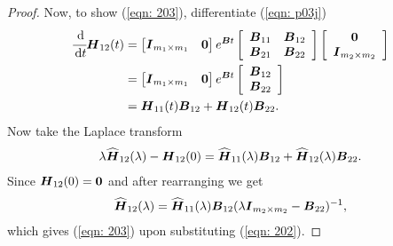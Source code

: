 \begin{proof}
	Now, to show (\ref{eqn: 203}), differentiate (\ref{eqn: p03j})
	\begin{align}
		\cfrac{\, \mathrm{d}}{\, \mathrm{d} t}\boldsymbol H_{12}(t) &= \begin{bmatrix}   \boldsymbol I_{m_1\times m_1} & \boldsymbol 0 \end{bmatrix}e^{\boldsymbol Bt} \left[\begin{array}{cc} \boldsymbol B_{11} & \boldsymbol B_{12} \\ \boldsymbol B_{21} & \boldsymbol B_{22} \end{array}\right] \left[\begin{array}{c} \boldsymbol 0 \\ \boldsymbol I_{m_2\times m_2}\end{array}\right] \nonumber
		\\&= \begin{bmatrix}   \boldsymbol I_{m_1\times m_1} & \boldsymbol 0 \end{bmatrix}e^{\boldsymbol Bt} \left[\begin{array}{c} \boldsymbol B_{12} \\ \boldsymbol B_{22} \end{array}\right] \nonumber
		\\&= \boldsymbol H_{11}(t) \boldsymbol B_{12} + \boldsymbol H_{12}(t)\boldsymbol B_{22}.
	\end{align}
	Now take the Laplace transform 
	\begin{align}
		\lambda \widehat{\boldsymbol H}_{12}(\lambda) - \boldsymbol H_{12}(0) = \widehat{\boldsymbol H}_{11}(\lambda) \boldsymbol B_{12} + \widehat{\boldsymbol H}_{12}(\lambda)\boldsymbol B_{22}.
	\end{align}
	Since \(\boldsymbol H_{12}(0)=\boldsymbol 0\) and after rearranging we get 
	\begin{align}
		\widehat{\boldsymbol H}_{12}(\lambda) = \widehat{\boldsymbol H}_{11}(\lambda) \boldsymbol B_{12} (\lambda \boldsymbol I_{m_2\times m_2} -\boldsymbol B_{22})^{-1},
	\end{align}
	which gives (\ref{eqn: 203}) upon substituting (\ref{eqn: 202}).
\end{proof}


